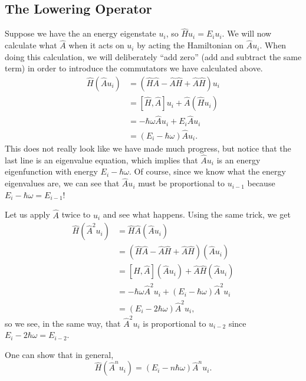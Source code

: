 \documentclass[../quantum_mechanics.tex]{subfiles}
\begin{document}
        \subsection{The Lowering Operator}\label{subsec:the-lowering-operator}
            Suppose we have the an energy eigenstate $u_i$, so $\hat{H}u_i=E_iu_i$.
            We will now calculate what $\hat{A}$ when it acts on $u_i$ by acting the Hamiltonian on $\hat{A}u_i$.
            When doing this calculation, we will deliberately ``add zero'' (add and subtract the same term) in order to introduce the commutators we have calculated above.
            \begin{align}
                \hat{H}(\hat{A}u_i)&=(\hat{H}\hat{A}-\hat{A}\hat{H}+\hat{A}\hat{H})u_i\\
                &=[\hat{H},\hat{A}]u_i+\hat{A}(\hat{H}u_i)\\
                &=-\hbar\omega\hat{A}u_i+E_i\hat{A}u_i\\
                &=(E_i-\hbar\omega)\hat{A}u_i.
            \end{align}
            This does not really look like we have made much progress, but notice that the last line is an eigenvalue equation, which implies that $\hat{A}u_i$ is an energy eigenfunction with energy $E_i-\hbar\omega$.
            Of course, since we know what the energy eigenvalues are, we can see that $\hat{A}u_i$ must be proportional to $u_{i-1}$ because $E_i-\hbar\omega=E_{i-1}$!

            Let us apply $\hat{A}$ twice to $u_i$ and see what happens.
            Using the same trick, we get
            \begin{align}
                \hat{H}(\hat{A}^2u_i)&=\hat{H}\hat{A}(\hat{A}u_i)\\
                &=(\hat{H}\hat{A}-\hat{A}\hat{H}+\hat{A}\hat{H})(\hat{A}u_i)\\
                &=[\hat{H},\hat{A}](\hat{A}u_i)+\hat{A}\hat{H}(\hat{A}u_i)\\
                &=-\hbar\omega\hat{A}^2u_i+(E_i-\hbar\omega)\hat{A}^2u_i\\
                &=(E_i-2\hbar\omega)\hat{A}^2u_i,
            \end{align}
            so we see, in the same way, that $\hat{A}^2u_i$ is proportional to $u_{i-2}$ since $E_i-2\hbar\omega=E_{i-2}$.

            One can show that in general,
            \begin{equation}
                \hat{H}(\hat{A}^nu_i)=(E_i-n\hbar\omega)\hat{A}^nu_i.
            \end{equation}
\end{document}
